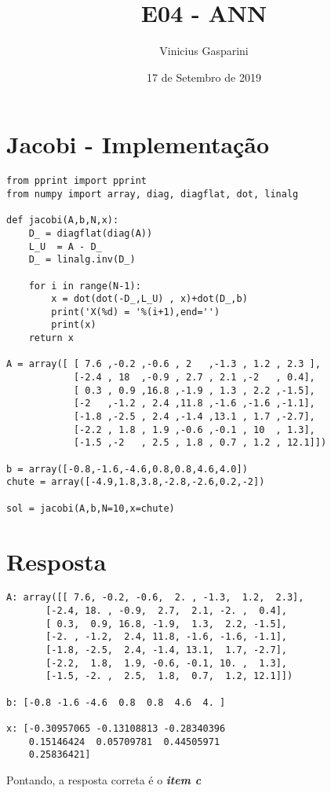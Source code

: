 \documentclass{article}
\title{E04 - ANN}
\author{Vinicius Gasparini}
\date{17 de Setembro de 2019}
\begin{document}
\maketitle

\section{Jacobi - Implementação}
\begin{lstlisting}[frame=single]
from pprint import pprint
from numpy import array, diag, diagflat, dot, linalg

def jacobi(A,b,N,x):                                                                                                                                                          
    D_ = diagflat(diag(A))
    L_U  = A - D_
    D_ = linalg.inv(D_)
                                                                                                                                                                         
    for i in range(N-1):
        x = dot(dot(-D_,L_U) , x)+dot(D_,b)
        print('X(%d) = '%(i+1),end='')
        print(x)
    return x

A = array([ [ 7.6 ,-0.2 ,-0.6 , 2   ,-1.3 , 1.2 , 2.3 ],
            [-2.4 , 18  ,-0.9 , 2.7 , 2.1 ,-2   , 0.4],
            [ 0.3 , 0.9 ,16.8 ,-1.9 , 1.3 , 2.2 ,-1.5],
            [-2   ,-1.2 , 2.4 ,11.8 ,-1.6 ,-1.6 ,-1.1],
            [-1.8 ,-2.5 , 2.4 ,-1.4 ,13.1 , 1.7 ,-2.7],
            [-2.2 , 1.8 , 1.9 ,-0.6 ,-0.1 , 10  , 1.3],
            [-1.5 ,-2   , 2.5 , 1.8 , 0.7 , 1.2 , 12.1]])

b = array([-0.8,-1.6,-4.6,0.8,0.8,4.6,4.0])
chute = array([-4.9,1.8,3.8,-2.8,-2.6,0.2,-2])

sol = jacobi(A,b,N=10,x=chute)
\end{lstlisting}
\newpage
\section{Resposta}
\begin{lstlisting}[frame=single]
A: array([[ 7.6, -0.2, -0.6,  2. , -1.3,  1.2,  2.3],
       [-2.4, 18. , -0.9,  2.7,  2.1, -2. ,  0.4],
       [ 0.3,  0.9, 16.8, -1.9,  1.3,  2.2, -1.5],
       [-2. , -1.2,  2.4, 11.8, -1.6, -1.6, -1.1],
       [-1.8, -2.5,  2.4, -1.4, 13.1,  1.7, -2.7],
       [-2.2,  1.8,  1.9, -0.6, -0.1, 10. ,  1.3],
       [-1.5, -2. ,  2.5,  1.8,  0.7,  1.2, 12.1]])

b: [-0.8 -1.6 -4.6  0.8  0.8  4.6  4. ]

x: [-0.30957065 -0.13108813 -0.28340396
    0.15146424  0.05709781  0.44505971
    0.25836421]
\end{lstlisting}
Pontando, a resposta correta é o \textit{\textbf{item c}}
\end{document}
